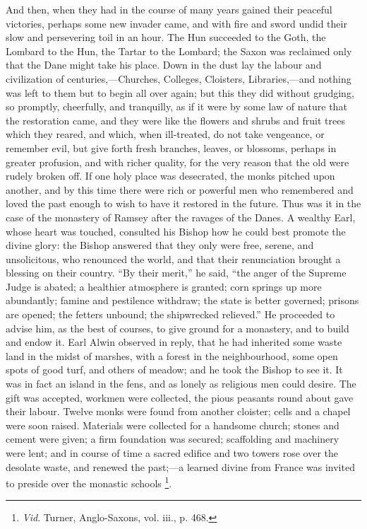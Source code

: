 And then, when they had in the course of many years gained their
peaceful victories, perhaps some new invader came, and with fire and
sword undid their slow and persevering toil in an hour. The Hun
succeeded to the Goth, the Lombard to the Hun, the Tartar to the
Lombard; the Saxon was reclaimed only that the Dane might take his
place. Down in the dust lay the labour and civilization of
centuries,—Churches, Colleges, Cloisters, Libraries,—and nothing
was left to them but to begin all over again; but this they did
without grudging, so promptly, cheerfully, and tranquilly, as if it
were by some law of nature that the restoration came, and they were
like the flowers and shrubs and fruit trees which they reared, and
which, when ill-treated, do not take vengeance, or remember evil, but
give forth fresh branches, leaves, or blossoms, perhaps in greater
profusion, and with richer quality, for the very reason that the old
were rudely broken off. If one holy place was desecrated, the monks
pitched upon another, and by this time there were rich or powerful men
who remembered and loved the past enough to wish to have it restored
in the future. Thus was it in the case of the monastery of Ramsey
after the ravages of the Danes. A wealthy Earl, whose heart was
touched, consulted his Bishop how he could best promote the divine
glory: the Bishop answered that they only were free, serene, and
unsolicitous, who renounced the world, and that their renunciation
brought a blessing on their country. ``By their merit,'' he
said, ``the anger of the Supreme Judge is abated; a healthier
atmosphere is granted; corn springs up more abundantly; famine and
pestilence withdraw; the state is better governed; prisons are opened;
the fetters unbound; the shipwrecked relieved.'' He proceeded to
advise him, as the best of courses, to give ground for a monastery,
and to build and endow it. Earl Alwin observed in reply, that he had
inherited some waste land in the midst of marshes, with a forest in
the neighbourhood, some open spots of good turf, and others of meadow;
and he took the Bishop to see it. It was in fact an island in the
fens, and as lonely as religious men could desire. The gift was
accepted, workmen were collected, the pious peasants round about
gave their labour. Twelve monks were found from another cloister;
cells and a chapel were soon raised. Materials were collected for a
handsome church; stones and cement were given; a firm foundation was
secured; scaffolding and machinery were lent; and in course of time a
sacred edifice and two towers rose over the desolate waste, and
renewed the past;—a learned divine from France was invited to
preside over the monastic schools \footnote{\emph{Vid}.
Turner, Anglo-Saxons, vol. iii., p. 468.}.

